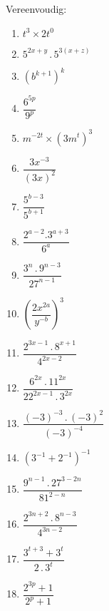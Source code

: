 \begin{eocexercises}{}


Vereenvoudig:
\begin{multicols}{2}
\begin{enumerate}[noitemsep, label=\textbf{\arabic*}., itemsep=5pt]
\item $ t^3 \times 2t^0 $
\item $ 5^{2x+y} \,.\, 5^{3(x+z)} $
\item $ (b^{k+1})^k $
\item $ \dfrac{6^{5p}}{9^p} $
\item $ m^{-2t} \times (3m^t)^3 $
\item $\dfrac{3{x}^{-3}}{{\left(3x\right)}^{2}}$
\item $\dfrac{{5}^{b-3}}{{5}^{b+1}}$
\item $\dfrac{{2}^{a-2}.{3}^{a+3}}{{6}^{a}}$
\item $\dfrac{{3}^{n}\ensuremath{\,.\,}{9}^{n-3}}{{27}^{n-1}}$
\item ${\left(\dfrac{2{x}^{2a}}{{y}^{-b}}\right)}^{3}$
\item $\dfrac{{2}^{3x-1}\ensuremath{\,.\,}{8}^{x+1}}{{4}^{2x-2}}$
\item $\dfrac{{6}^{2x}\ensuremath{\,.\,}{11}^{2x}}{{22}^{2x-1}\ensuremath{\,.\,}{3}^{2x}}$
\item $\dfrac{{\left(-3\right)}^{-3}\ensuremath{\,.\,}{\left(-3\right)}^{2}}{{\left(-3\right)}^{-4}}$
\item ${\left({3}^{-1}+{2}^{-1}\right)}^{-1}$
\item $\dfrac{{9}^{n-1}\ensuremath{\,.\,}{27}^{3-2n}}{{81}^{2-n}}$
\item $\dfrac{{2}^{3n+2}\ensuremath{\,.\,}{8}^{n-3}}{{4}^{3n-2}}$
\item $\dfrac{3^{t+3} + 3^t}{2 \,.\, 3^t} $
\item $\dfrac{2^{3p} +1}{2^p + 1} $
\end{enumerate}
\end{multicols}




\end{eocexercises}

